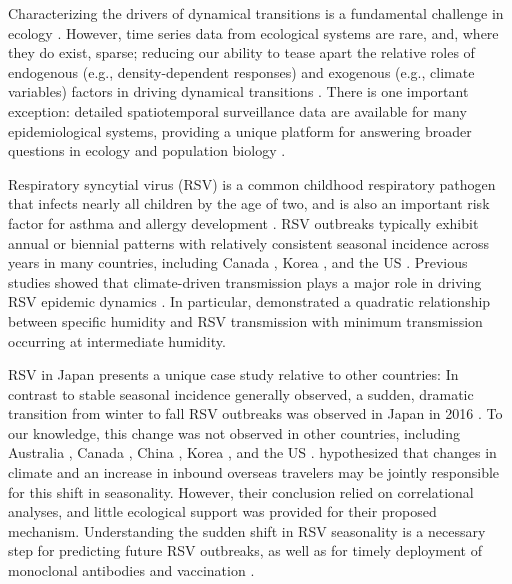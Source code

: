 \documentclass[12pt]{article}
\begin{document}
Characterizing the drivers of dynamical transitions is a fundamental challenge in ecology \citep{earn2000simple,hastings2004transients,hastings2018transient}.
However, time series data from ecological systems are rare, and, where they do exist, sparse; reducing our ability to tease apart the relative roles of endogenous (e.g., density-dependent responses) and exogenous (e.g., climate variables) factors in driving dynamical transitions \citep{hunter1998cycles,lundberg2000population,hernandez2012fluctuations}.
There is one important exception: detailed spatiotemporal surveillance data are available for many epidemiological systems, providing a unique platform for answering broader questions in ecology and population biology \citep{levin1997mathematical,anderson1991infectious,grenfell2001travelling,he2010plug}.

Respiratory syncytial virus (RSV) is a common childhood respiratory pathogen that infects nearly all children by the age of two, and is also an important risk factor for asthma and allergy development \citep{sigurs1995asthma,sigurs2010asthma,edwards2012microbiology}.
RSV outbreaks typically exhibit annual or biennial patterns with relatively consistent seasonal incidence across years in many countries, including Canada \citep{paramo2023respiratory}, Korea \citep{kim2020investigation}, and the US \citep{pitzer2015environmental,baker2019epidemic}.
Previous studies showed that climate-driven transmission plays a major role in driving RSV epidemic dynamics \citep{pitzer2015environmental,baker2019epidemic}.
In particular, \cite{baker2019epidemic} demonstrated a quadratic relationship between specific humidity and RSV transmission with minimum transmission occurring at intermediate humidity.

RSV in Japan presents a unique case study relative to other countries: In contrast to stable seasonal incidence generally observed, a sudden, dramatic transition from winter to fall RSV outbreaks was observed in Japan in 2016 \citep{miyama2021seasonal,wagatsuma2021shifts}.
To our knowledge, this change was not observed in other countries, including Australia \citep{nazareno2022modelled}, Canada \citep{canada-report}, China \citep{luo2022comparison,li2023defining,li2024characterising}, Korea \citep{kim2023molecular}, and the US \citep{rose2018respiratory,hansen2022mortality}.
\cite{wagatsuma2021shifts} hypothesized that changes in climate and an increase in inbound overseas travelers may be jointly responsible for this shift in seasonality.
However, their conclusion relied on correlational analyses, and little ecological support was provided for their proposed mechanism.
Understanding the sudden shift in RSV seasonality is a necessary step for predicting future RSV outbreaks, as well as for timely deployment of monoclonal antibodies and vaccination \citep{mazur2023respiratory}.
\end{document}

